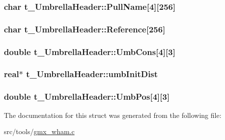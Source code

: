 \hypertarget{structt__UmbrellaHeader_a3cc1e5a7f79128da070f5ccc0bdebdd7}{
\subsubsection[{\-Pull\-Name}]{\setlength{\rightskip}{0pt plus 5cm}char {\bf t\-\_\-\-Umbrella\-Header\-::\-Pull\-Name}\mbox{[}4\mbox{]}\mbox{[}256\mbox{]}}}\label{structt__UmbrellaHeader_a3cc1e5a7f79128da070f5ccc0bdebdd7}
\hypertarget{structt__UmbrellaHeader_a4d49e2c056ad71973f24f42a7d21d3bf}{
\subsubsection[{\-Reference}]{\setlength{\rightskip}{0pt plus 5cm}char {\bf t\-\_\-\-Umbrella\-Header\-::\-Reference}\mbox{[}256\mbox{]}}}\label{structt__UmbrellaHeader_a4d49e2c056ad71973f24f42a7d21d3bf}
\hypertarget{structt__UmbrellaHeader_a5270c65bb361a83c3c29d4e3bce65e1c}{
\subsubsection[{\-Umb\-Cons}]{\setlength{\rightskip}{0pt plus 5cm}double {\bf t\-\_\-\-Umbrella\-Header\-::\-Umb\-Cons}\mbox{[}4\mbox{]}\mbox{[}3\mbox{]}}}\label{structt__UmbrellaHeader_a5270c65bb361a83c3c29d4e3bce65e1c}
\hypertarget{structt__UmbrellaHeader_acb2eaa424f7840e114ed030b6774138a}{
\subsubsection[{umb\-Init\-Dist}]{\setlength{\rightskip}{0pt plus 5cm}real$\ast$ {\bf t\-\_\-\-Umbrella\-Header\-::umb\-Init\-Dist}}}\label{structt__UmbrellaHeader_acb2eaa424f7840e114ed030b6774138a}
\hypertarget{structt__UmbrellaHeader_a40ab99ebe9635119925247df13c4e5a3}{
\subsubsection[{\-Umb\-Pos}]{\setlength{\rightskip}{0pt plus 5cm}double {\bf t\-\_\-\-Umbrella\-Header\-::\-Umb\-Pos}\mbox{[}4\mbox{]}\mbox{[}3\mbox{]}}}\label{structt__UmbrellaHeader_a40ab99ebe9635119925247df13c4e5a3}


\-The documentation for this struct was generated from the following file\-:\begin{DoxyCompactItemize}
\item 
src/tools/\hyperlink{gmx__wham_8c}{gmx\-\_\-wham.\-c}\end{DoxyCompactItemize}
